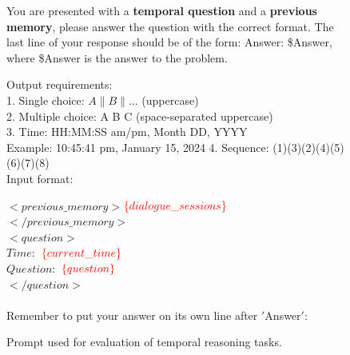 \documentclass{article} %
\begin{document}
\begin{figure}[t]
\begin{tcolorbox}[
colframe=black!75!white,
colback=white, sharp corners,
boxrule=0.8pt, width=\textwidth,
title=Prompt for Evaluation
]

You are presented with a \textbf{temporal question} and a \textbf{previous memory}, please answer the question with the correct format.  
The last line of your response should be of the form: Answer: \$Answer, where \$Answer is the answer to the problem.

Output requirements:\\
1. Single choice: $A \| B \| ...$ (uppercase) \\
2. Multiple choice: A B C (space-separated uppercase)\\
3. Time: HH:MM:SS am/pm, Month DD, YYYY  \\
   Example: 10:45:41 pm, January 15, 2024
4. Sequence: (1)(3)(2)(4)(5)(6)(7)(8) \\

Input format:

$<previous\_memory>$$\textcolor{red}{\{dialogue\_sessions\}}$$</previous\_memory>$ \\

$<question>$ \\
$Time:$ $\textcolor{red}{\{current\_time\}}$ \\
$Question:$ $\textcolor{red}{\{question\}} $ \\
$</question>$
\\
\\
Remember to put your answer on its own line after $'$Answer$'$:

\end{tcolorbox}
\caption{Prompt used for evaluation of temporal reasoning tasks.}
\label{fig:evaluation-prompt}
\end{figure}
\end{document}
